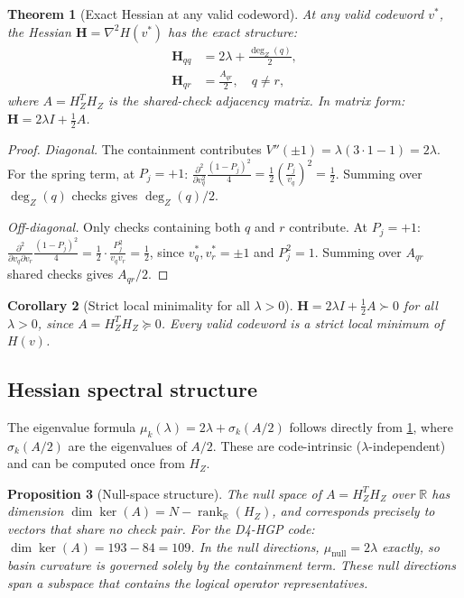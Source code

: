 \documentclass[12pt,a4paper]{article}
\theoremstyle{plain}
\newtheorem{theorem}{Theorem}[section]
\newtheorem{proposition}[theorem]{Proposition}
\newtheorem{corollary}[theorem]{Corollary}
\theoremstyle{definition}
\theoremstyle{remark}
\newcommand{\R}{\mathbb{R}}
\newcommand{\HZ}{H_Z}
\newcommand{\rank}{\operatorname{rank}}
\newcommand{\dZ}{\operatorname{deg}_Z}
\begin{document}
\begin{theorem}[Exact Hessian at any valid codeword]\label{thm:hessian}
At any valid codeword $v^*$, the Hessian $\mathbf{H} = \nabla^2 H(v^*)$
has the exact structure:
\begin{align}
  \mathbf{H}_{qq} &= 2\lambda + \frac{\dZ(q)}{2}, \label{eq:hess_diag} \\
  \mathbf{H}_{qr} &= \frac{A_{qr}}{2}, \quad q \neq r,
    \label{eq:hess_offdiag}
\end{align}
where $A = \HZ^T\HZ$ is the shared-check adjacency matrix.
In matrix form: $\mathbf{H} = 2\lambda I + \tfrac{1}{2}A$.
\end{theorem}

\begin{proof}
\emph{Diagonal.}
The containment contributes $V''(\pm 1) = \lambda(3\cdot 1-1) = 2\lambda$.
For the spring term, at $P_j = +1$:
$\frac{\partial^2}{\partial v_q^2}\frac{(1-P_j)^2}{4} = \frac{1}{2}\left(\frac{P_j}{v_q}\right)^2 = \frac{1}{2}$.
Summing over $\dZ(q)$ checks gives $\dZ(q)/2$.

\emph{Off-diagonal.}
Only checks containing both $q$ and $r$ contribute.
At $P_j = +1$:
$\frac{\partial^2}{\partial v_q \partial v_r}\frac{(1-P_j)^2}{4}
  = \frac{1}{2}\cdot \frac{P_j^2}{v_q v_r} = \frac{1}{2}$,
since $v_q^*,v_r^* = \pm 1$ and $P_j^2 = 1$.
Summing over $A_{qr}$ shared checks gives $A_{qr}/2$.
\end{proof}

\begin{corollary}[Strict local minimality for all $\lambda > 0$]\label{cor:local_min}
$\mathbf{H} = 2\lambda I + \tfrac{1}{2}A \succ 0$ for all $\lambda > 0$,
since $A = \HZ^T\HZ \succeq 0$.
Every valid codeword is a strict local minimum of $H(v)$.
\end{corollary}

\subsection{Hessian spectral structure}

The eigenvalue formula $\mu_k(\lambda) = 2\lambda + \sigma_k(A/2)$ follows
directly from \cref{thm:hessian}, where $\sigma_k(A/2)$ are the eigenvalues
of $A/2$.
These are code-intrinsic ($\lambda$-independent) and can be computed once
from $\HZ$.

\begin{proposition}[Null-space structure]\label{prop:null}
The null space of $A = \HZ^T\HZ$ over $\R$ has dimension
$\dim\ker(A) = N - \rank_{\R}(\HZ)$,
and corresponds precisely to vectors that share no check pair.
For the D4-HGP code: $\dim\ker(A) = 193 - 84 = 109$.
In the null directions, $\mu_{\mathrm{null}} = 2\lambda$ exactly, so
basin curvature is governed solely by the containment term.
These null directions span a subspace that contains the logical operator
representatives.
\end{proposition}
\end{document}
